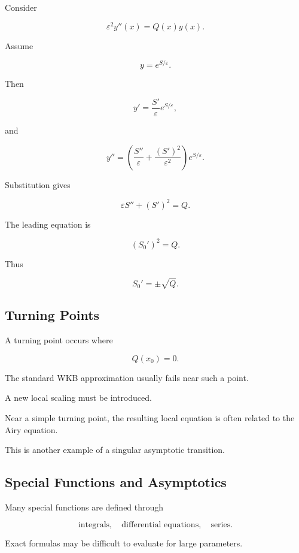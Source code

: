 Consider

\[
\varepsilon^2y''(x)
=
Q(x)y(x).
\]

Assume

\[
y=e^{S/\varepsilon}.
\]

Then

\[
y'
=
\frac{S'}{\varepsilon}e^{S/\varepsilon},
\]

and

\[
y''
=
\left(
\frac{S''}{\varepsilon}
+
\frac{(S')^2}{\varepsilon^2}
\right)
e^{S/\varepsilon}.
\]

Substitution gives

\[
\varepsilon S''
+
(S')^2
=
Q.
\]

The leading equation is

\[
\boxed{
(S_0')^2=Q.
}
\]

Thus

\[
S_0'
=
\pm\sqrt{Q}.
\]

\subsection{Turning Points}
\label{subsec:turning-points}

A turning point occurs where

\[
\boxed{
Q(x_0)=0.
}
\]

The standard WKB approximation usually fails near such a point.

A new local scaling must be introduced.

Near a simple turning point, the resulting local equation is often
related to the Airy equation.

This is another example of a singular asymptotic transition.

\subsection{Special Functions and Asymptotics}
\label{subsec:special-functions-asymptotics}

Many special functions are defined through

\[
\boxed{
\text{integrals},
\quad
\text{differential equations},
\quad
\text{series}.
}
\]

Exact formulas may be difficult to evaluate for large parameters.

